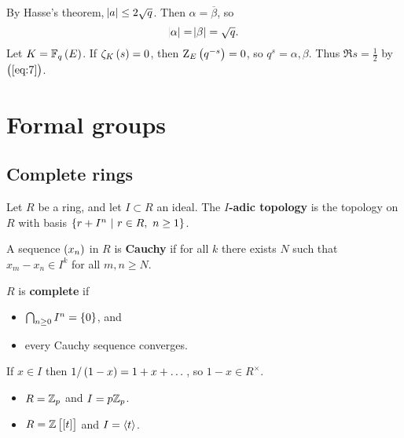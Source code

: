 \begin{remark*}
By Hasse's theorem, $ \abs{a} \le 2\sqrt{q} $. Then $ \alpha = \overline{\beta} $, so
\begin{equation}
\label{eq:7}
\abs{\alpha} = \abs{\beta} = \sqrt{q}.
\end{equation}
Let $ K = \FF_q\br{E} $. If $ \zeta_K\br{s} = 0 $, then $ \Z_E\br{q^{-s}} = 0 $, so $ q^s = \alpha, \beta $. Thus $ \Re s = \tfrac{1}{2} $ by $ \br{\ref{eq:7}} $.
\end{remark*}

\pagebreak

\section{Formal groups}

\subsection{Complete rings}

\begin{definition*}
Let $ R $ be a ring, and let $ I \subset R $ an ideal. The \textbf{$ I $-adic topology} is the topology on $ R $ with basis $ \cbr{r + I^n \st r \in R, \ n \ge 1} $.
\end{definition*}

\begin{definition*}
A sequence $ \br{x_n} $ in $ R $ is \textbf{Cauchy} if for all $ k $ there exists $ N $ such that $ x_m - x_n \in I^k $ for all $ m, n \ge N $.
\end{definition*}

\begin{definition*}
$ R $ is \textbf{complete} if
\begin{itemize}
\item $ \bigcap_{n \ge 0} I^n = \cbr{0} $, and
\item every Cauchy sequence converges.
\end{itemize}
\end{definition*}

\begin{remark*}
If $ x \in I $ then $ 1 / \br{1 - x} = 1 + x + \dots $, so $ 1 - x \in R^\times $.
\end{remark*}

\begin{example*}
\hfill
\begin{itemize}
\item $ R = \mathbb{Z}_p $ and $ I = p\mathbb{Z}_p $.
\item $ R = \ZZ\sbr{\sbr{t}} $ and $ I = \left\langle t \right\rangle $.
\end{itemize}
\end{example*}

